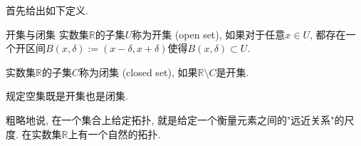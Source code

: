 

首先给出如下定义.

\begin{definition}{开集与闭集}
实数集$\mathbb{R}$的子集$U$称为开集 (open set), 如果对于任意$x\in U$, 都存在一个开区间$B(x,\delta):=(x-\delta,x+\delta)$使得$B(x,\delta)\subset U$. 

实数集$\mathbb{R}$的子集$C$称为闭集 (closed set), 如果$\mathbb{R}\setminus C$是开集.

规定空集既是开集也是闭集.
\end{definition}

粗略地说, 在一个集合上给定拓扑, 就是给定一个衡量元素之间的"远近关系"的尺度. 在实数集$\mathbb{R}$上有一个自然的拓扑. 
